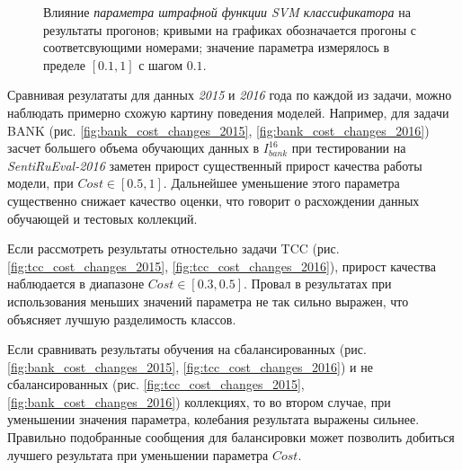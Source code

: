 \begin{figure}[!htp]
    \caption{
        Влияние {\it параметра штрафной функции SVM классификатора}
        на результаты прогонов;
        кривыми на графиках обозначается прогоны с соответсвующими номерами;
        значение параметра измерялось в пределе $[0.1, 1]$ с шагом $0.1$.
    }
    \label{fig:cost}
\end{figure}

Сравнивая резулататы для данных {\it 2015} и {\it 2016} года по каждой из задачи, можно
наблюдать примерно схожую картину поведения моделей. Например, для задачи
BANK (рис. \ref{fig:bank_cost_changes_2015}, \ref{fig:bank_cost_changes_2016})
засчет большего объема обучающих данных в $I_{bank}^{16}$ при тестировании на
{ \it SentiRuEval-2016} заметен прирост существенный прирост качества работы
модели, при $Cost \in \left[0.5, 1\right]$.
Дальнейшее уменьшение этого параметра существенно снижает качество
оценки, что говорит о расхождении данных обучающей и тестовых коллекций.

Если рассмотреть результаты отностельно задачи TCC (рис.
\ref{fig:tcc_cost_changes_2015}, \ref{fig:tcc_cost_changes_2016}),
прирост качества наблюдается в диапазоне $Cost \in [0.3, 0.5]$.
Провал в результатах при использования меньших значений параметра
не так сильно выражен, что объясняет лучшую разделимость классов.

Если сравнивать результаты обучения на сбалансированных (рис.
\ref{fig:bank_cost_changes_2015}, \ref{fig:tcc_cost_changes_2016}) и не
сбалансированных (рис. \ref{fig:tcc_cost_changes_2015},
\ref{fig:bank_cost_changes_2016}) коллекциях, то во втором случае, при
уменьшении значения параметра, колебания результата выражены сильнее.
Правильно подобранные сообщения для балансировки
может позволить добиться лучшего результата при уменьшении параметра $Cost$.

